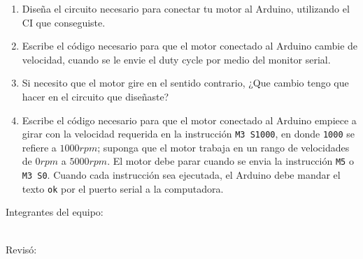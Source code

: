 	\begin{enumerate}
		\item Diseña el circuito necesario para conectar tu motor al Arduino, utilizando el CI que conseguiste. \\ \vspace{7cm}
		\item Escribe el código necesario para que el motor conectado al Arduino cambie de velocidad, cuando se le envie el duty cycle por medio del monitor serial. \\
		\item Si necesito que el motor gire en el sentido contrario, ¿Que cambio tengo que hacer en el circuito que diseñaste? \\ \vspace{7cm}
		\item Escribe el código necesario para que el motor conectado al Arduino empiece a girar con la velocidad requerida en la instrucción \texttt{M3 S1000}, en donde \texttt{1000} se refiere a $1000rpm$; suponga que el motor trabaja en un rango de velocidades de $0rpm$ a $5000rpm$. El motor debe parar cuando se envia la instrucción \texttt{M5} o \texttt{M3 S0}. Cuando cada instrucción sea ejecutada, el Arduino debe mandar el texto \texttt{ok} por el puerto serial a la computadora.\\
	\end{enumerate}

	\begin{multicols}{2}
		Integrantes del equipo: \\[0.4cm]
		\horrule{0.5pt} \\[0.4cm] %
		\horrule{0.5pt} %

		Revisó: \\[1.25cm]
		\horrule{0.5pt} \\%
	\end{multicols}




